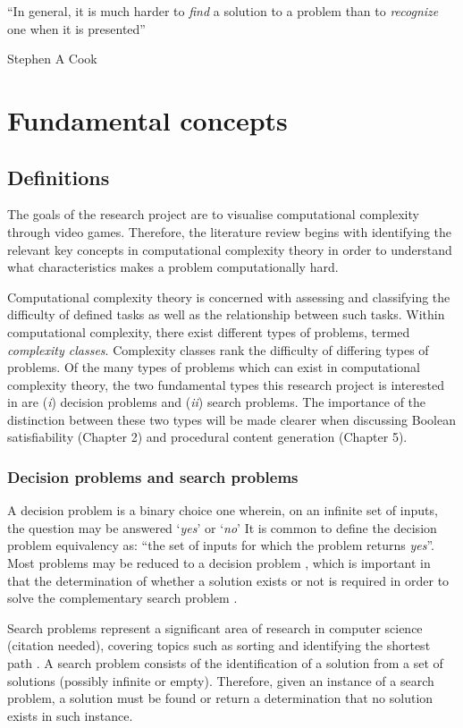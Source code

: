 \documentclass[11pt, a4paper, oneside]{report} %
\begin{document}
\epigraph{``In general, it is much harder to \textit{find} a solution to a problem than to
\textit{recognize} one when it is presented''}{Stephen A Cook \cite{cook1984can}}

\section{Fundamental concepts}

\subsection{Definitions}

The goals of the research project are to visualise computational complexity
through video games. Therefore, the literature review begins with identifying
the relevant key concepts in computational complexity theory in order to
understand what characteristics makes a problem computationally hard.

Computational complexity theory is concerned with assessing and classifying the
difficulty of defined tasks as well as the relationship between such tasks.
Within computational complexity, there exist different types of problems, termed
\textit{complexity classes}. Complexity classes rank the difficulty of differing
types of problems. Of the many types of problems which can exist in
computational complexity theory, the two fundamental types this research project
is interested in are (\textit{i}) decision problems and (\textit{ii}) search
problems. The importance of the distinction between these two types will be made
clearer when discussing Boolean satisfiability (Chapter 2) and procedural
content generation (Chapter 5).

\subsubsection{Decision problems and search problems}

A decision problem is a binary choice one wherein, on an infinite set of inputs,
the question may be answered `\textit{yes}' or `\textit{no}'  It is common  to
define the decision problem equivalency as: ``the set of inputs for which the
problem returns \textit{yes}''. Most problems may be reduced to a decision
problem \cite{kendall2008survey}, which is important in that the determination
of whether a solution exists or not is required in order to solve the
complementary search problem \cite{Goldreich:2008}.

Search problems represent a significant area of research in computer science
(citation needed), covering topics such as sorting and identifying the shortest
path \cite{Goldreich:2008}. A search problem consists of the identification of a
solution from a set of solutions (possibly infinite or empty). Therefore, given
an instance of a search problem, a solution must be found or return a
determination that no solution exists in such instance.
\end{document}
